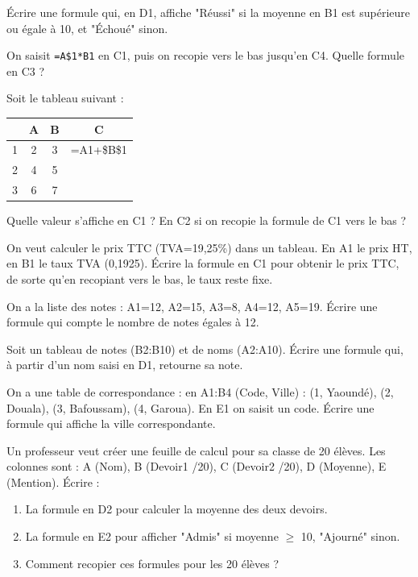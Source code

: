\exo{}
Écrire une formule qui, en D1, affiche "Réussi" si la moyenne en B1 est supérieure ou égale à 10, et "Échoué" sinon.


\exo{}
On saisit \texttt{=A\$1*B1} en C1, puis on recopie vers le bas jusqu'en C4. Quelle formule en C3 ?

\exo{}
Soit le tableau suivant :
\begin{center}
\begin{tabular}{|c|c|c|c|}
\hline
 & A & B & C \\ \hline
1 & 2 & 3 & =A1+\$B\$1 \\ \hline
2 & 4 & 5 & \\ \hline
3 & 6 & 7 & \\ \hline
\end{tabular}
\end{center}
Quelle valeur s'affiche en C1 ? En C2 si on recopie la formule de C1 vers le bas ?

\exo{}
On veut calculer le prix TTC (TVA=19,25\%) dans un tableau. En A1 le prix HT, en B1 le taux TVA (0,1925). Écrire la formule en C1 pour obtenir le prix TTC, de sorte qu'en recopiant vers le bas, le taux reste fixe.


\exo{}
On a la liste des notes : A1=12, A2=15, A3=8, A4=12, A5=19. Écrire une formule qui compte le nombre de notes égales à 12.

\exo{}
Soit un tableau de notes (B2:B10) et de noms (A2:A10). Écrire une formule qui, à partir d'un nom saisi en D1, retourne sa note.

\exo{}
On a une table de correspondance : en A1:B4 (Code, Ville) : (1, Yaoundé), (2, Douala), (3, Bafoussam), (4, Garoua). En E1 on saisit un code. Écrire une formule qui affiche la ville correspondante.


\exo{}
Un professeur veut créer une feuille de calcul pour sa classe de 20 élèves. Les colonnes sont : A (Nom), B (Devoir1 /20), C (Devoir2 /20), D (Moyenne), E (Mention). Écrire :
\begin{enumerate}
    \item La formule en D2 pour calculer la moyenne des deux devoirs.
    \item La formule en E2 pour afficher "Admis" si moyenne $\ge$ 10, "Ajourné" sinon.
    \item Comment recopier ces formules pour les 20 élèves ?
\end{enumerate}

